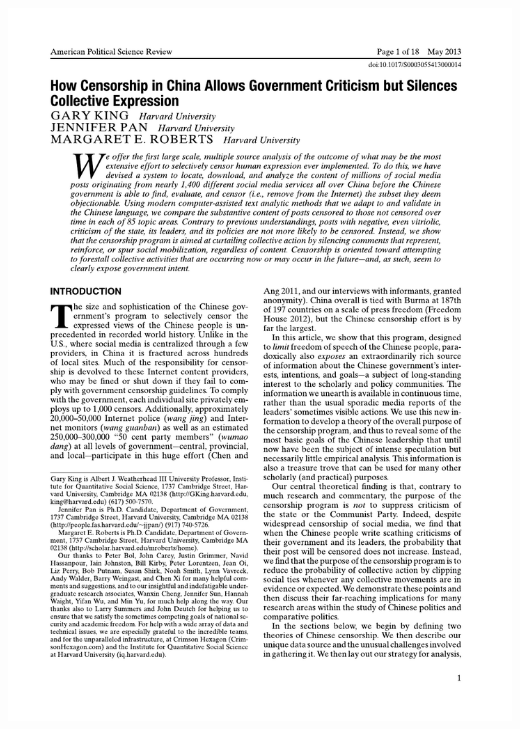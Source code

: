 \documentclass[
  10pt,
  ignorenonframetext,
]{beamer}
\begin{document}
\begin{frame}
\begin{center}\includegraphics[width=0.9\linewidth]{Figs/Examples/molly_cover} \end{center}
\end{frame}
\end{document}
